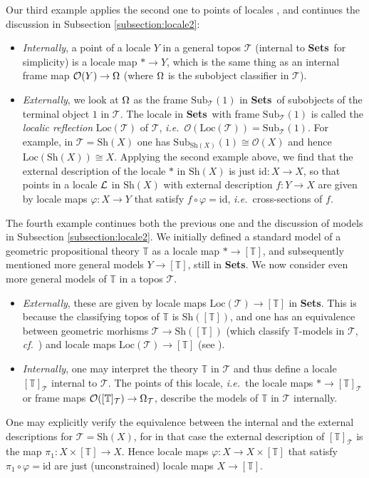 \documentclass[12pt]{article}
\newcommand{\Sets}{\mbox{\textbf{Sets}}}
\newcommand{\raw}{\rightarrow} \newcommand{\rat}{\mapsto}
\newcommand{\CO}{{\mathcal O}} \newcommand{\CP}{{\mathcal P}}
\newcommand{\CT}{{\mathcal T}} \newcommand{\CV}{{\mathcal V}}
\newcommand{\T}{{\mathbb T}} \newcommand{\Z}{{\mathbb Z}}
\newcommand{\Sh}{\ensuremath{\mathrm{Sh}}}
\newcommand{\ie}{\textit{i.e.}}
\begin{document}
Our third example applies the second one to points of locales
\cite{maclanemoerdijk92}, and continues the discussion
in Subsection \ref{subsection:locale2}:
\begin{itemize}
\item {\it Internally},  a point of a locale $Y$ in a general topos
 $\CT$ (internal to \Sets\ for simplicity) is a  locale map  $*\raw Y$, which is
the same thing as
  an internal  frame map $\CO(Y)\raw\Om$ (where $\Omega$ is the subobject
classifier in $\CT$).
  \item {\it
 Externally}, we look at $\Omega$ as the frame $\mathrm{Sub}_{\CT}(1)$ in \Sets\
 of subobjects of the terminal object $1$ in $\CT$. The locale in \Sets\ with
frame  $\mathrm{Sub}_{\CT}(1)$ is called the {\it localic reflection}
 $\mathrm{Loc}(\CT)$ of $\CT$, \ie\
$\CO(\mathrm{Loc}(\CT))=\mathrm{Sub}_{\CT}(1)$.
 For example, in $\CT=\Sh(X)$ one has $\mathrm{Sub}_{\Sh(X)}(1)\cong\CO(X)$ and
hence
 $\mathrm{Loc}(\Sh(X))\cong X$. Applying the second example above, we find that
 the external description of the locale $*$ in $\Sh(X)$ is just
 $\mathrm{id}:X\raw X$, so that  points in a locale ${\mathcal L}$ in $\Sh(X)$
 with external description $f:Y\raw X$ are given by locale maps
 $\varphi:X\raw Y$ that satisfy $f\circ\varphi=\mathrm{id}$, \ie\
 cross-sections of $f$.
\end{itemize}

The fourth example continues both the previous one and the discussion  of models
in Subsection \ref{subsection:locale2}. We initially defined a standard model
of a geometric propositional theory $\T$ as a locale map $*\raw[\T]$, and
subsequently mentioned more general models
$Y\raw [\T]$, still in \Sets. We now consider even more general models of $\T$
in a topos $\CT$.
\begin{itemize}
\item
{\it Externally}, these are given by  locale maps $\mathrm{Loc}(\CT)\raw [\T]$
in \Sets. This is because the classifying topos of $\T$ is $\Sh([\T])$, and one
has an equivalence
between geometric morhisms $\CT\raw \Sh([\T])$ (which classify $\T$-models in
$\CT$, {\it cf.}\  \cite[Thm.\  X.6.1]{maclanemoerdijk92})
and locale maps $\mathrm{Loc}(\CT)\raw [\T]$ (see
\cite[\S~IX.5]{maclanemoerdijk92}).
\item
{\it Internally}, one may interpret the theory $\T$ in $\CT$ and thus define a
locale
$[\T]_{\CT}$ internal to $\CT$. The points of this locale, \ie\ the locale maps
 $*\raw [\T]_{\CT}$ or frame maps $\CO( [\T]_{\CT})\raw\Om_{\CT}$,
 describe the  models of $\T$ in  $\CT$ internally.
\end{itemize}
 One may explicitly verify the equivalence between the internal and
 the external descriptions for $\CT=\Sh(X)$, for in that case the
 external description of $[\T]_{\CT}$ is the map $\pi_1: X\times
 [\T]\raw X$. Hence locale
 maps  $\varphi:X\raw  X\times [\T]$ that satisfy
 $\pi_1\circ\varphi=\mathrm{id}$ are just (unconstrained) locale
 maps $X\raw  [\T]$.
\end{document}
